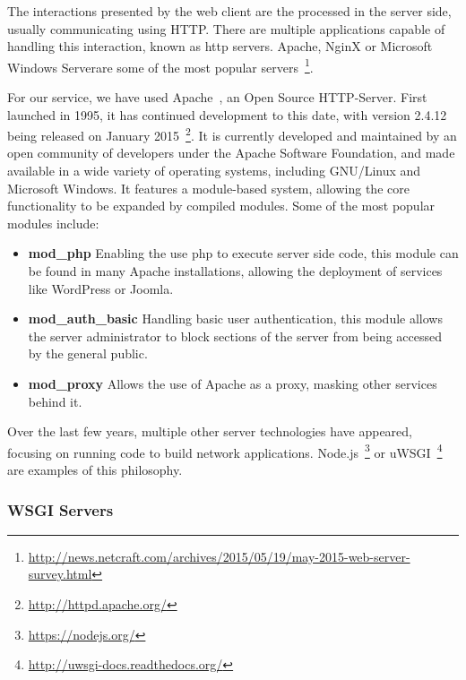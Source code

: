
The interactions presented by the web client are the processed in the server side, usually communicating using HTTP. There are multiple applications capable of handling this interaction, known as http servers. Apache, NginX or Microsoft Windows Server\textregistered are some of the most popular servers~\footnote{\url{http://news.netcraft.com/archives/2015/05/19/may-2015-web-server-survey.html}}. 

For our service, we have used Apache~\cite{apacheabout}, an Open Source HTTP-Server. First launched in 1995, it has continued development to this date, with version 2.4.12 being released on January 2015~\footnote{\url{http://httpd.apache.org/}}. It is currently developed and maintained by an open community of developers under the Apache Software Foundation, and made available in a wide variety of operating systems, including GNU/Linux and Microsoft Windows\textregistered. It features a module-based system, allowing the core functionality to be expanded by compiled modules. Some of the most popular modules include:

\begin{itemize}[topsep=0pt,itemsep=-1ex,partopsep=1ex,parsep=1ex]
 \item \textbf{mod_php} Enabling the use php to execute server side code, this module can be found in many Apache installations, allowing the deployment of services like WordPress or Joomla.
 \item \textbf{mod_auth_basic} Handling basic user authentication, this module allows the server administrator to block sections of the server from being accessed by the general public.
 \item \textbf{mod_proxy} Allows the use of Apache as a proxy, masking other services behind it.
\end{itemize}

Over the last few years, multiple other server technologies have appeared, focusing on running code to build network applications. Node.js~\footnote{\url{https://nodejs.org/}} or uWSGI~\footnote{\url{http://uwsgi-docs.readthedocs.org/}} are examples of this philosophy.

\subsubsection{WSGI Servers}




